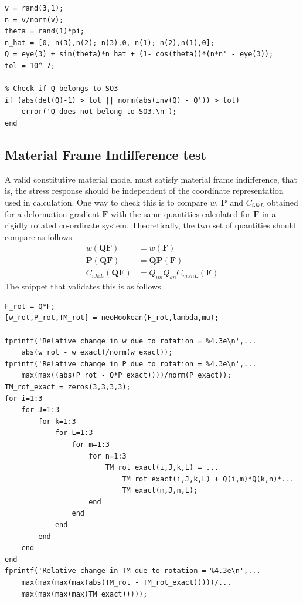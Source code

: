 \documentclass[../main.tex]{subfiles}
\begin{document}
\begin{lstlisting}[style = Matlab-editor]
v = rand(3,1);
n = v/norm(v);
theta = rand(1)*pi;
n_hat = [0,-n(3),n(2); n(3),0,-n(1);-n(2),n(1),0];
Q = eye(3) + sin(theta)*n_hat + (1- cos(theta))*(n*n' - eye(3));
tol = 10^-7;

% Check if Q belongs to SO3
if (abs(det(Q)-1) > tol || norm(abs(inv(Q) - Q')) > tol)
    error('Q does not belong to SO3.\n');
end
\end{lstlisting}

\subsection{Material Frame Indifference test}
\label{sec:mfi}
A valid constitutive material model must satisfy material frame
indifference, that is, the stress response should be independent of
the coordinate representation used in calculation. One way to check
this is to compare $w$, $\mathbf{P}$ and $C_{iJkL}$ obtained for a
deformation gradient $\mathbf{F}$ with the same quantities calculated
for $\mathbf{F}$ in a rigidly rotated co-ordinate
system. Theoretically, the two set of quantities should compare as
follows.
\begin{align*}
  w(\mathbf{QF}) &= w(\mathbf{F})\\
  \mathbf{P}(\mathbf{QF}) &= \mathbf{Q}\mathbf{P}(\mathbf{F})\\
  C_{iJkL}(\mathbf{QF}) &= Q_{im}Q_{kn}C_{mJnL}(\mathbf{F})
\end{align*}
The snippet that validates this is as follows
\begin{lstlisting}[style=Matlab-editor]
%% Checking Material Frame Indifference
F_rot = Q*F;
[w_rot,P_rot,TM_rot] = neoHookean(F_rot,lambda,mu);

fprintf('Relative change in w due to rotation = %4.3e\n',...
    abs(w_rot - w_exact)/norm(w_exact));
fprintf('Relative change in P due to rotation = %4.3e\n',...
    max(max((abs(P_rot - Q*P_exact))))/norm(P_exact));
TM_rot_exact = zeros(3,3,3,3);
for i=1:3
    for J=1:3
        for k=1:3
            for L=1:3
                for m=1:3
                    for n=1:3
                        TM_rot_exact(i,J,k,L) = ...
                            TM_rot_exact(i,J,k,L) + Q(i,m)*Q(k,n)*...
                            TM_exact(m,J,n,L);
                    end
                end
            end
        end
    end
end
fprintf('Relative change in TM due to rotation = %4.3e\n',...
    max(max(max(max(abs(TM_rot - TM_rot_exact)))))/...
    max(max(max(max(TM_exact)))));
\end{lstlisting}
\end{document}
